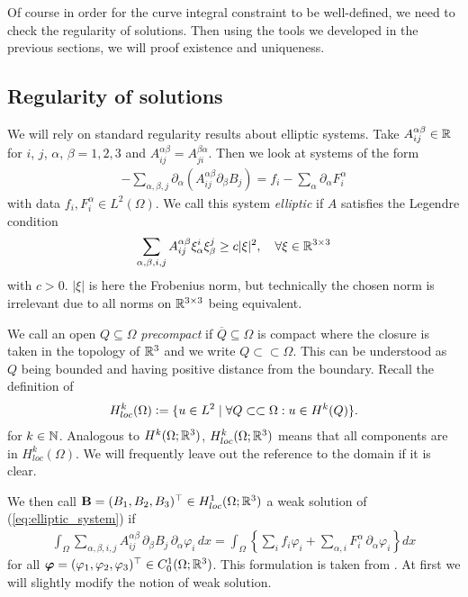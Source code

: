 \documentclass[../master_thesis.tex]{subfiles}
\begin{document}
Of course in order for the curve integral constraint to be well-defined, 
we need to check the regularity of solutions. Then using the tools we developed
in the previous sections, we will proof existence and uniqueness.

\subsection{Regularity of solutions}\label{sec:regularity_of_solutions}

We will rely on standard regularity results about elliptic systems. 
Take $A_{ij}^{\alpha \beta} \in \mathbb{R}$
for $i$, $j$, $\alpha$, $\beta = 1,2,3$ and 
$A_{ij}^{\alpha \beta} = A_{ji}^{\beta \alpha}$. Then we look at systems of the 
form 
\begin{align}
    -\sum\limits_{\alpha, \beta, j} \partial_\alpha 
        (A_{ij}^{\alpha \beta} \partial_\beta B_j)
    = f_i - \sum\limits_\alpha \partial_\alpha F_i^\alpha
    \label{eq:elliptic_system}
\end{align}
with data $f_i, F_i^\alpha \in L^2(\Omega)$. We call this system 
\textit{elliptic} if $A$ satisfies the Legendre condition
\begin{align}
    \sum_{\alpha,\beta,i,j}A_{ij}^{\alpha \beta} \xi_\alpha^i \xi_\beta^j
    \geq c |\xi|^2, \quad \forall \xi \in \real^{3 \times 3} 
    \label{eq:legendre_condition}
\end{align}
with $c > 0$. $|\xi|$ is here the Frobenius norm, but technically the chosen 
norm is irrelevant due to all norms on $\mathbb{R}^{3 \times 3}$ being equivalent.

We call an open $Q \subseteq \Omega$ \textit{precompact} if 
$\overline{Q} \subseteq \Omega$ is compact where the closure is taken in the topology of $\mathbb{R}^3$
and we write $Q \subset\subset \Omega$. This can be understood as 
$Q$ being bounded and having positive distance from the boundary.
Recall the definition of 
\begin{align*}
    H^k_{loc}(\Omega) \vcentcolon= \{ u\in L^2 
        \mid \forall Q\subset\subset \Omega: u \in H^k(Q) \}.
\end{align*}
for $k \in \mathbb{N}$.
Analogous to $H^k(\Omega;\mathbb{R}^3)$, $H^k_{loc}(\Omega;\mathbb{R}^3)$ means that 
all components are in $H^k_{loc}(\Omega)$. We will frequently leave out the 
reference to the domain if it is clear.

We then call $\mathbf{B} = (B_1, B_2, B_3)^\top \in H^1_{loc}(\Omega;\mathbb{R}^3)$ a weak solution
of (\ref{eq:elliptic_system}) if 
\begin{align}
    \int_\Omega \sum\limits_{\alpha,\beta,i,j} 
        A_{ij}^{\alpha \beta} \,\partial_\beta B_j \, \partial_\alpha \varphi_i \, dx
    = \int_\Omega \left\{ \sum\limits_i f_i \varphi_i + 
        \sum\limits_{\alpha,i} F_i^\alpha \, \partial_\alpha \varphi_i \right\} dx
    \label{eq:weak_elliptic_system}
\end{align}
for all $\bm{\varphi} = (\varphi_1, \varphi_2, \varphi_3)^\top \in C^1_0(\Omega;\mathbb{R}^3)$. 
This formulation is taken from 
\cite[Sec. 1.3]{lectures_on_elliptic_pdes}. At first we will slightly modify
the notion of weak solution. 
\end{document}
